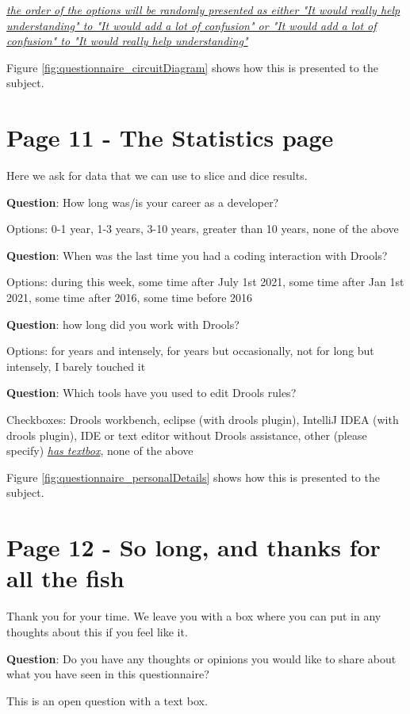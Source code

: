 \emph{\underline{the order of the options will be randomly presented as either "It would really help understanding" to "It would add a lot of confusion" or "It would add a lot of confusion" to "It would really help understanding"}}

Figure \ref{fig:questionnaire_circuitDiagram} shows how this is presented to the subject.

\section{Page 11 - The Statistics page}
Here we ask for data that we can use to slice and dice results.

\textbf{Question}: How long was/is your career as a developer?

Options: 0-1 year, 1-3 years, 3-10 years, greater than 10 years, none of the above

\textbf{Question}: When was the last time you had a coding interaction with Drools?

Options: during this week, some time after July 1st 2021, some time after Jan 1st 2021, some time after 2016, some time before 2016

\textbf{Question}: how long did you work with Drools?

Options: for years and intensely, for years but occasionally, not for long but intensely, I barely touched it


\textbf{Question}: Which tools have you used to edit Drools rules?

Checkboxes: Drools workbench, eclipse (with drools plugin), IntelliJ IDEA (with drools plugin), IDE or text editor without Drools assistance, other (please specify) \emph{\underline{has textbox}}, none of the above

Figure \ref{fig:questionnaire_personalDetails} shows how this is presented to the subject.

\section{Page 12 - So long, and thanks for all the fish}
Thank you for your time.
We leave you with a box where you can put in any thoughts about this if you feel like it.

\textbf{Question}: Do you have any thoughts or opinions you would like to share about what you have seen in this questionnaire?

This is an open question with a text box.

